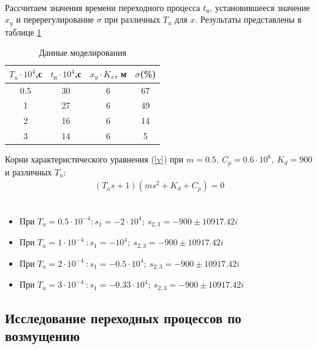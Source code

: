 \documentclass[a4paper,12pt]{article}
\renewcommand{\arraystretch}{1.5}
\begin{document}
	\paragraph{}Рассчитаем значения времени переходного процесса $t_\text{п}$, установившееся значение $x_y$ и перерегулирование $\sigma$ при различных $T_u$ для $x$. Результаты представлены в таблице \ref{t_3}
	\begin{table}[h]
		\centering
		\caption{Данные моделирования}
		\renewcommand{\arraystretch}{2} 
		\renewcommand{\tabcolsep}{1.45cm}
		\begin{center}
			\begin{tabular}{|c|c|c|c|}
				\hline
				$T_u\cdot 10^{4}$,с & $t_\text{п} \cdot 10^4$,с & $x_y\cdot K_x$, м & $\sigma$(\%)  \\ \hline
				0.5 & 30 & 6 & 67 \\ \hline
				1 & 27 & 6 & 49 \\ \hline
				2 & 16 & 6 & 14 \\ \hline
				3 & 14 & 6 & 5 \\ \hline
			\end{tabular}
		\end{center}
		\label{t_3}
	\end{table}
	
	Корни характеристического уравнения (\ref{v}) при $m=0.5,~C_p=0.6\cdot 10^8,~K_d=900$ и различных $T_u$:\\
	\begin{gather}
	(T_u s+1)(ms^2+K_d+C_p)=0 \label{v}
	\end{gather}
	\\
	
	\begin{itemize}
		\item При $T_u=0.5\cdot 10^{-4}: s_1=-2\cdot 10^4;~ s_{2,3}=-900\pm 10917.42i$\\
		\item При $T_u=1\cdot 10^{-4}~: s_1=-10^4;~ s_{2,3}=-900\pm 10917.42i$\\
		\item При $T_u=2\cdot 10^{-4}~: s_1=-0.5\cdot 10^4;~ s_{2,3}=-900\pm 10917.42i$\\
		\item При $T_u=3\cdot 10^{-4}~: s_1=-0.33\cdot 10^4;~ s_{2,3}=-900\pm 10917.42i$\\
	\end{itemize}
	
	
	\newpage
	\begin{center}
	\section{Исследование переходных процессов по возмущению}
	\end{center}
\end{document}
